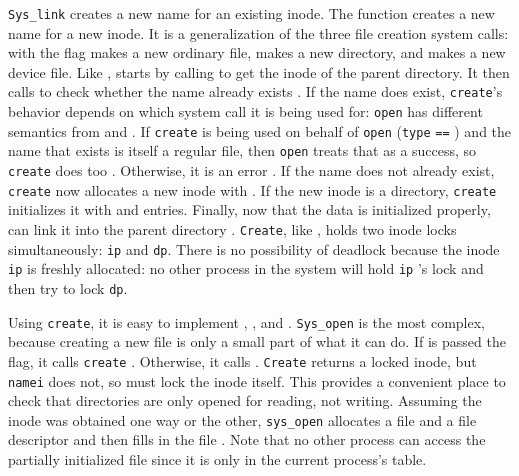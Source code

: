 \lstinline{Sys_link}
creates a new name for an existing inode.
The function
creates a new name for a new inode.
It is a generalization of the three file creation
system calls:
with the
flag makes a new ordinary file,
makes a new directory,
and
makes a new device file.
Like
,
starts by calling
to get the inode of the parent directory.
It then calls
to check whether the name already exists
.
If the name does exist, 
\lstinline{create}'s
behavior depends on which system call it is being used for:
\lstinline{open}
has different semantics from 
and
.
If
\lstinline{create}
is being used on behalf of
\lstinline{open}
(\lstinline{type}
\lstinline{==}
)
and the name that exists is itself
a regular file,
then 
\lstinline{open}
treats that as a success,
so
\lstinline{create}
does too
.
Otherwise, it is an error
.
If the name does not already exist,
\lstinline{create}
now allocates a new inode with
.
If the new inode is a directory, 
\lstinline{create}
initializes it with
and
entries.
Finally, now that the data is initialized properly,
can link it into the parent directory
.
\lstinline{Create},
like
,
holds two inode locks simultaneously:
\lstinline{ip}
and
\lstinline{dp}.
There is no possibility of deadlock because
the inode
\lstinline{ip}
is freshly allocated: no other process in the system
will hold 
\lstinline{ip} 's
lock and then try to lock
\lstinline{dp}.

Using
\lstinline{create},
it is easy to implement
,
,
and
.
\lstinline{Sys_open}
is the most complex, because creating a new file is only
a small part of what it can do.
If
is passed the
flag, it calls
\lstinline{create}
.
Otherwise, it calls
.
\lstinline{Create}
returns a locked inode, but 
\lstinline{namei}
does not, so
must lock the inode itself.
This provides a convenient place to check that directories
are only opened for reading, not writing.
Assuming the inode was obtained one way or the other,
\lstinline{sys_open}
allocates a file and a file descriptor
and then fills in the file
.
Note that no other process can access the partially initialized file since it is only
in the current process's table.

